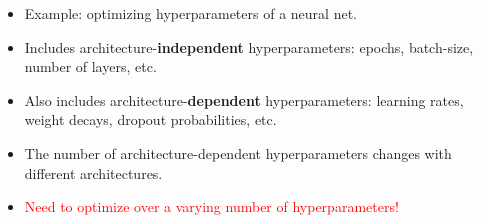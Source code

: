 \documentclass[landscape,a0b,final,a4resizeable]{include/a0poster}
\begin{document}
\begin{poster}
\large




\begin{multicols}{3}
%

\vspace{0.5in}

\begin{minipage}[c]{0.17\textwidth}
\begin{itemize}
	\item Example: optimizing hyperparameters of a neural net.
	\item Includes architecture-\textbf{independent} hyperparameters: epochs, batch-size, number of layers, etc.
	\item Also includes architecture-\textbf{dependent} hyperparameters: learning rates, weight decays, dropout probabilities, etc.
	\item The number of architecture-dependent hyperparameters changes with different architectures.
	\item \textcolor{red} {Need to optimize over a varying number of hyperparameters!}
\end{itemize}
\end{minipage}
\begin{minipage}[c]{0.15\textwidth}
\begin{centering}
\begin{tabular}{c}
 \\
\end{tabular}
\end{centering}
\end{minipage}


\end{multicols}
\end{poster}
\end{document}
